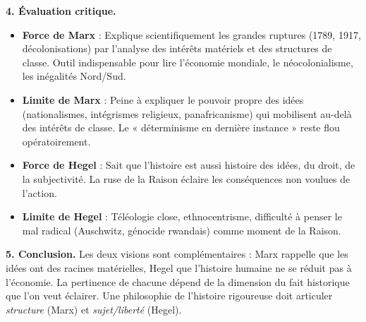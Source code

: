 \documentclass[11pt]{article}
\begin{document}
\begin{exoresolu}
\textbf{4. Évaluation critique.}
\begin{itemize}
\item \textbf{Force de Marx} : Explique scientifiquement les grandes ruptures (1789, 1917, décolonisations) par l'analyse des intérêts matériels et des structures de classe. Outil indispensable pour lire l'économie mondiale, le néocolonialisme, les inégalités Nord/Sud.
\item \textbf{Limite de Marx} : Peine à expliquer le pouvoir propre des idées (nationalismes, intégrismes religieux, panafricanisme) qui mobilisent au-delà des intérêts de classe. Le « déterminisme en dernière instance » reste flou opératoirement.
\item \textbf{Force de Hegel} : Sait que l'histoire est aussi histoire des idées, du droit, de la subjectivité. La \guillemotleft ruse de la Raison \guillemotright éclaire les conséquences non voulues de l'action.
\item \textbf{Limite de Hegel} : Téléologie close, ethnocentrisme, difficulté à penser le mal radical (Auschwitz, génocide rwandais) comme moment de la Raison.
\end{itemize}

\textbf{5. Conclusion.} Les deux visions sont complémentaires : Marx rappelle que les idées ont des racines matérielles, Hegel que l'histoire humaine ne se réduit pas à l'économie. La pertinence de chacune dépend de la dimension du fait historique que l'on veut éclairer. Une philosophie de l'histoire rigoureuse doit articuler \emph{structure} (Marx) et \emph{sujet/liberté} (Hegel).
\end{exoresolu}
\end{document}
